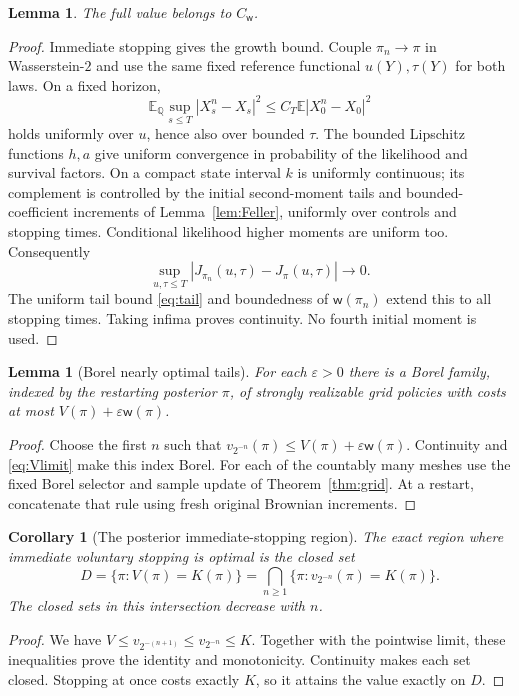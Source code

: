 \documentclass[11pt,a4paper]{article}
\newtheorem{lemma}[theorem]{Lemma}
\newtheorem{corollary}[theorem]{Corollary}
\theoremstyle{definition}
\theoremstyle{remark}
\newcommand{\E}{\mathbb E}
\newcommand{\Qq}{\mathbb Q}
\newcommand{\CW}{C_{\mathsf w}}
\newcommand{\wt}{\mathsf w}
\begin{document}
\begin{lemma}\label{lem:Vcontinuous}
The full value belongs to \(\CW\).
\end{lemma}
\begin{proof}
Immediate stopping gives the growth bound. Couple
\(\pi_n\to\pi\) in Wasserstein-\(2\) and use the same fixed reference
functional \(u(Y),\tau(Y)\) for both laws. On a fixed horizon,
\[
 \E_\Qq\sup_{s\leq T}|X_s^n-X_s|^2
       \leq C_T\E|X_0^n-X_0|^2
\]
holds uniformly over \(u\), hence also over bounded \(\tau\).
The bounded Lipschitz functions \(h,a\) give uniform convergence
in probability of the likelihood and survival factors.
On a compact state interval \(k\) is uniformly continuous; its
complement is controlled by the initial second-moment tails and
bounded-coefficient increments of Lemma~\ref{lem:Feller}, uniformly
over controls and stopping times. Conditional likelihood higher
moments are uniform too. Consequently
\[
 \sup_{u,\tau\leq T}|J_{\pi_n}(u,\tau)-J_\pi(u,\tau)|
             \longrightarrow0.
\]
The uniform tail bound \eqref{eq:tail} and boundedness of
\(\wt(\pi_n)\) extend this to all stopping times.
Taking infima proves continuity. No fourth initial moment is used.
\end{proof}

\begin{lemma}[Borel nearly optimal tails]\label{lem:paste}
For each \(\varepsilon>0\) there is a Borel family, indexed by the
restarting posterior \(\pi\), of strongly realizable grid policies
with costs at most \(V(\pi)+\varepsilon\wt(\pi)\).
\end{lemma}
\begin{proof}
Choose the first \(n\) such that
\(v_{2^{-n}}(\pi)\leq V(\pi)+\varepsilon\wt(\pi)\).
Continuity and \eqref{eq:Vlimit} make this index Borel.
For each of the countably many meshes use the fixed Borel selector
and sample update of Theorem~\ref{thm:grid}. At a restart, concatenate
that rule using fresh original Brownian increments.
\end{proof}

\begin{corollary}[The posterior immediate-stopping region]
\label{cor:stopregion}
The exact region where immediate voluntary stopping is optimal is
the closed set
\[
 D=\{\pi:V(\pi)=K(\pi)\}
   =\bigcap_{n\geq1}\{\pi:v_{2^{-n}}(\pi)=K(\pi)\}.
\]
The closed sets in this intersection decrease with \(n\).
\end{corollary}
\begin{proof}
We have \(V\leq v_{2^{-(n+1)}}\leq v_{2^{-n}}\leq K\).
Together with the pointwise limit, these inequalities prove the
identity and monotonicity. Continuity makes each set closed.
Stopping at once costs exactly \(K\), so it attains the value
exactly on \(D\).
\end{proof}
\end{document}
